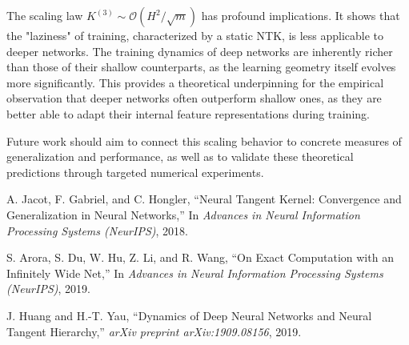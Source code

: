 \documentclass{article}
\newcommand{\Order}{\mathcal{O}}
\begin{document}
The scaling law $K^{(3)} \sim \Order(H^2/\sqrt{m})$ has profound implications. It shows that the "laziness" of training, characterized by a static NTK, is less applicable to deeper networks. The training dynamics of deep networks are inherently richer than those of their shallow counterparts, as the learning geometry itself evolves more significantly. This provides a theoretical underpinning for the empirical observation that deeper networks often outperform shallow ones, as they are better able to adapt their internal feature representations during training.

Future work should aim to connect this scaling behavior to concrete measures of generalization and performance, as well as to validate these theoretical predictions through targeted numerical experiments.


\begin{thebibliography}{9}

A. Jacot, F. Gabriel, and C. Hongler,
\newblock ``Neural Tangent Kernel: Convergence and Generalization in Neural Networks,''
\newblock In \emph{Advances in Neural Information Processing Systems (NeurIPS)}, 2018.

S. Arora, S. Du, W. Hu, Z. Li, and R. Wang,
\newblock ``On Exact Computation with an Infinitely Wide Net,''
\newblock In \emph{Advances in Neural Information Processing Systems (NeurIPS)}, 2019.

J. Huang and H.-T. Yau,
\newblock ``Dynamics of Deep Neural Networks and Neural Tangent Hierarchy,''
\newblock \emph{arXiv preprint arXiv:1909.08156}, 2019.

\end{thebibliography}
\end{document}
